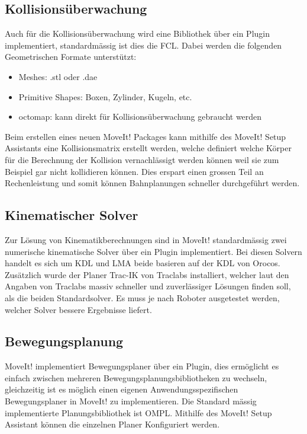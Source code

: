 \subsection{Kollisionsüberwachung}
Auch für die Kollisionsüberwachung wird eine Bibliothek über ein Plugin implementiert, standardmässig ist dies die \gls{FCL}. Dabei werden die folgenden Geometrischen Formate unterstützt:\cite{Pan2012}
\begin{itemize}
	\itemsep0pt
	\item Meshes: .stl oder .dae
	\item Primitive Shapes: Boxen, Zylinder, Kugeln, etc.
	\item \gls{octomap}: kann direkt für Kollisionsüberwachung gebraucht werden
\end{itemize}
Beim erstellen eines neuen MoveIt! Packages kann mithilfe des MoveIt! Setup Assistants eine Kollisionsmatrix erstellt werden, welche definiert welche Körper für die Berechnung der Kollision vernachlässigt werden können weil sie zum Beispiel gar nicht kollidieren können. Dies erspart einen grossen Teil an Rechenleistung und somit können Bahnplanungen schneller durchgeführt werden.\cite{Chitta2016}

\subsection{Kinematischer Solver}
Zur Lösung von Kinematikberechnungen sind in MoveIt! standardmässig zwei numerische kinematische Solver über ein Plugin implementiert.\cite{Chitta2016} Bei diesen Solvern handelt es sich um KDL und LMA beide basieren auf der \gls{KDL} von Orocos.\cite{Kinemati93:online} Zusätzlich wurde der Planer Trac-IK von Traclabs installiert, welcher laut den Angaben von Traclabs massiv schneller und zuverlässiger Lösungen finden soll, als die beiden Standardsolver.\cite{traclabs28:online} Es muss je nach Roboter ausgetestet werden, welcher Solver bessere Ergebnisse liefert.

\subsection{Bewegungsplanung}
MoveIt! implementiert Bewegungsplaner über ein Plugin, dies ermöglicht es einfach zwischen mehreren Bewegungsplanungsbibliotheken zu wechseln, gleichzeitig ist es möglich einen eigenen Anwendungsspezifischen Bewegungsplaner in MoveIt! zu implementieren. Die Standard mässig implementierte Planungsbibliothek ist \gls{OMPL}. Mithilfe des MoveIt! Setup Assistant können die einzelnen Planer Konfiguriert werden.\cite{Chitta2016} \\

